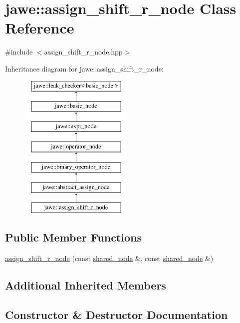 \hypertarget{classjawe_1_1assign__shift__r__node}{}\section{jawe\+:\+:assign\+\_\+shift\+\_\+r\+\_\+node Class Reference}
\label{classjawe_1_1assign__shift__r__node}


{\ttfamily \#include $<$assign\+\_\+shift\+\_\+r\+\_\+node.\+hpp$>$}

Inheritance diagram for jawe\+:\+:assign\+\_\+shift\+\_\+r\+\_\+node\+:\begin{figure}[H]
\begin{center}
\leavevmode
\includegraphics[height=7.000000cm]{classjawe_1_1assign__shift__r__node}
\end{center}
\end{figure}
\subsection*{Public Member Functions}
\begin{DoxyCompactItemize}
\item 
\hyperlink{classjawe_1_1assign__shift__r__node_a9258e637ddc109a6b8709f3076716c8e}{assign\+\_\+shift\+\_\+r\+\_\+node} (const \hyperlink{namespacejawe_a3f307481d921b6cbb50cc8511fc2b544}{shared\+\_\+node} \&, const \hyperlink{namespacejawe_a3f307481d921b6cbb50cc8511fc2b544}{shared\+\_\+node} \&)
\end{DoxyCompactItemize}
\subsection*{Additional Inherited Members}


\subsection{Constructor \& Destructor Documentation}
\mbox{\label{classjawe_1_1assign__shift__r__node_a9258e637ddc109a6b8709f3076716c8e}} 
